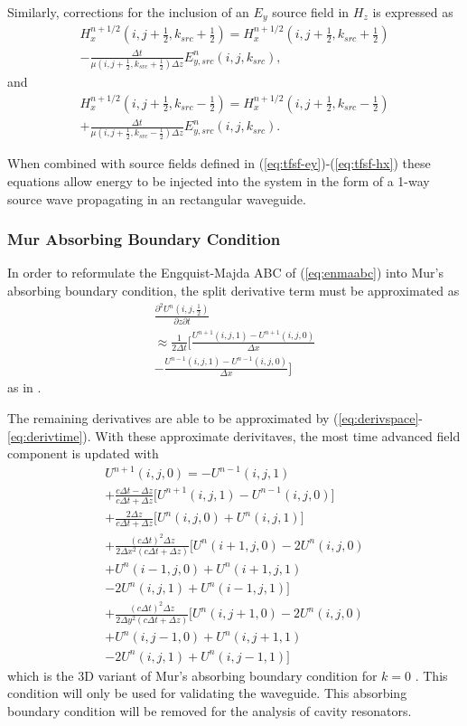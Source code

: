 Similarly, corrections for the inclusion of an $E_y$ source field in $H_z$ is expressed as
\begin{multline}
	H_x^{n+1/2}(i,j+\tfrac{1}{2},k_{src}+\tfrac{1}{2}) = H_x^{n+1/2}(i,j+\tfrac{1}{2},k_{src}+\tfrac{1}{2}) \\
	-\frac{\Delta t}{\mu(i,j+\tfrac{1}{2},k_{src}+\tfrac{1}{2})\Delta z}E_{y,src}^n(i,j,k_{src}),
\end{multline}
and
\begin{multline}
	H_x^{n+1/2}(i,j+\tfrac{1}{2},k_{src}-\tfrac{1}{2}) = H_x^{n+1/2}(i,j+\tfrac{1}{2},k_{src}-\tfrac{1}{2}) \\
	+\frac{\Delta t}{\mu(i,j+\tfrac{1}{2},k_{src}-\tfrac{1}{2})\Delta z}E_{y,src}^n(i,j,k_{src}).
\end{multline}

When combined with source fields defined in  (\ref{eq:tfsf-ey})-(\ref{eq:tfsf-hx}) these equations allow energy to be injected into the system in the form of a 1-way source wave propagating in an rectangular waveguide\cite{taftlovefdtd}.

\subsubsection{Mur Absorbing Boundary Condition}
\label{subsubsec:mur-timestep}
In order to reformulate the Engquist-Majda ABC of  (\ref{eq:enmaabc}) into Mur's absorbing boundary condition, the split derivative term must be approximated as
\begin{multline}
	\frac{\partial^2 U^n(i,j,\tfrac{1}{2})}{\partial z\partial t} \\ \approx\frac{1}{2\Delta t}\bigg[\frac{U^{n+1}(i,j,1)-U^{n+1}(i,j,0)}{\Delta x} \\ -\frac{U^{n-1}(i,j,1)-U^{n-1}(i,j,0)}{\Delta x}\bigg]
\end{multline}
as in \cite{taftlovefdtd}.

The remaining derivatives are able to be approximated by  (\ref{eq:derivspace}-\ref{eq:derivtime}). With these approximate derivitaves, the most time advanced field component is updated with
\begin{multline}
	U^{n+1}(i,j,0) = -U^{n-1}(i,j,1) \\
	+\frac{c\Delta t - \Delta z}{c\Delta t + \Delta z}\bigg[U^{n+1}(i,j,1)-U^{n-1}(i,j,0)\bigg] \\ 
	+\frac{2\Delta z}{c\Delta t+\Delta z}\bigg[U^n(i,j,0)+U^n(i,j,1)\bigg] \\
	+\frac{(c\Delta t)^2\Delta z}{2\Delta x^2(c\Delta t+\Delta z)}\bigg[U^n(i+1,j,0)-2U^n(i,j,0) \\ 
	+U^n(i-1,j,0) + U^n(i+1,j,1) \\ -2U^n(i,j,1)+U^n(i-1,j,1)\bigg] \\ 
	+\frac{(c\Delta t)^2\Delta z}{2\Delta y^2(c\Delta t+\Delta z)}\bigg[U^n(i,j+1,0)-2U^n(i,j,0) \\ 
	+U^n(i,j-1,0) + U^n(i,j+1,1) \\ -2U^n(i,j,1)+U^n(i,j-1,1)\bigg]
\end{multline}
which is the 3D variant of Mur's absorbing boundary condition for $k=0$ \cite{taftlovefdtd}. This condition will only be used for validating the waveguide. This absorbing boundary condition will be removed for the analysis of cavity resonators.